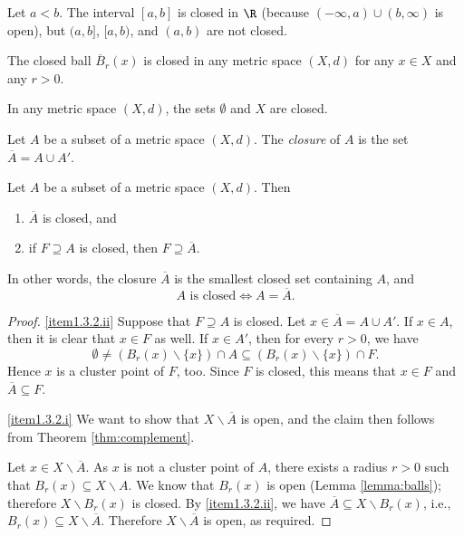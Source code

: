 \begin{example}
Let $a < b$. The interval $[a,b]$ is closed in $\R$ (because $(-\infty,a) \cup (b,\infty)$ is open),
but $(a,b]$, $[a,b)$, and $(a,b)$ are not closed.
\end{example}


\begin{example}
The closed ball $\overline{B}_r(x)$ is closed in any metric space $(X,d)$ for any $x \in X$ and any $r > 0$.
\end{example}

\begin{example}
In any metric space $(X,d)$, the sets $\emptyset$ and $X$ are closed.
\end{example}

\begin{definition}[Closure]
Let $A$ be a subset of a metric space $(X,d)$. The \emph{closure} of $A$
is the set $\overline{A} = A \cup A'$.
\end{definition}

\begin{theorem} \label{thm:closure}
Let $A$ be a subset of a metric space $(X,d)$. Then
\begin{enumerate}
\item \label{item1.3.2.i} $\overline{A}$ is closed, and
\item \label{item1.3.2.ii} if $F \supseteq A$ is closed, then $F \supseteq \overline{A}$.
\end{enumerate}
\end{theorem}

In other words, the closure $\overline{A}$ is the smallest closed set containing $A$, and 
$$
A \mbox{ is closed} \Leftrightarrow A = \overline A.
$$

\np

\begin{proof}
\eqref{item1.3.2.ii} Suppose that $F \supseteq A$ is closed. Let
$x \in \overline{A} = A \cup A'$. If $x \in A$, then it is
clear that $x \in F$ as well. If $x \in A'$, then for every
$r > 0$, we have
\[
\emptyset \not= (B_r(x) \backslash \{x\}) \cap A \subseteq (B_r(x) \backslash \{x\}) \cap F.
\]
Hence $x$ is a cluster point of $F$, too. Since $F$ is closed,
this means that $x \in F$ and $\overline{A} \subseteq F$.

\bis

\eqref{item1.3.2.i} We want to show that $X \backslash \overline{A}$ is open, and the
claim then follows from Theorem \ref{thm:complement}.

Let $x \in X \backslash \overline{A}$. As $x$ is not a cluster point of $A$,
there exists a radius $r > 0$ such that $B_r(x) \subseteq X \backslash A$.
We know that $B_r(x)$ is open (Lemma \ref{lemma:balls}); therefore  $X \backslash B_r(x)$
is closed. By \eqref{item1.3.2.ii}, we have $\overline{A} \subseteq X \backslash B_r(x)$,
i.e., $B_r(x) \subseteq X \backslash \overline{A}$. Therefore $X \backslash \overline{A}$
is open, as required.
\end{proof}


